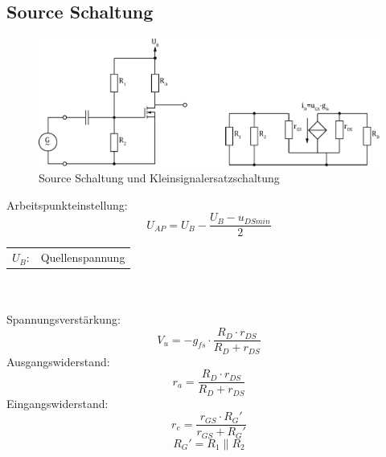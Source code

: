 



\subsection{Source Schaltung}
\begin{figure}[h!]
	\centering
	\includegraphics[width = \linewidth]{fet_source.pdf}
	\caption{Source Schaltung und Kleinsignalersatzschaltung}
	\label{fet:sourceschaltung}
\end{figure}
\noindent
Arbeitspunkteinstellung:
\[ U_{AP} = U_B - \frac{U_B - u_{DSmin}}{2} \]
\begin{tabular}{@{}ll}
  $U_B$:        & Quellenspannung
\end{tabular}
\\\\
Spannungsverstärkung:
\[ V_u = -g_{fs} \cdot \frac{R_D \cdot r_{DS}}{R_D + r_{DS}} \]
Ausgangswiderstand:
\[ r_a = \frac{R_D \cdot r_{DS}}{R_D + r_{DS}} \]
Eingangswiderstand:
\[ r_e = \frac{r_{GS} \cdot R_G'}{r_{GS} + R_G'}\]
\[ R_G' = R_1 \parallel R_2 \]